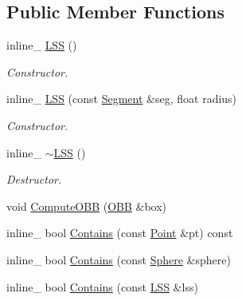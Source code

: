 \subsection*{Public Member Functions}
\begin{DoxyCompactItemize}
\item 
inline\+\_\+ \hyperlink{classOpcode_1_1LSS_ab3ce2e0a510d377bc30d91f4007eb24e}{L\+SS} ()\hypertarget{classOpcode_1_1LSS_ab3ce2e0a510d377bc30d91f4007eb24e}{}\label{classOpcode_1_1LSS_ab3ce2e0a510d377bc30d91f4007eb24e}

\begin{DoxyCompactList}\small\item\em Constructor. \end{DoxyCompactList}\item 
inline\+\_\+ \hyperlink{classOpcode_1_1LSS_ad894b442ef98a841561a26e2f7b96566}{L\+SS} (const \hyperlink{classOpcode_1_1Segment}{Segment} \&seg, float radius)\hypertarget{classOpcode_1_1LSS_ad894b442ef98a841561a26e2f7b96566}{}\label{classOpcode_1_1LSS_ad894b442ef98a841561a26e2f7b96566}

\begin{DoxyCompactList}\small\item\em Constructor. \end{DoxyCompactList}\item 
inline\+\_\+ \hyperlink{classOpcode_1_1LSS_a4f570ca299ea69ecad6fce52d3a33d03}{$\sim$\+L\+SS} ()\hypertarget{classOpcode_1_1LSS_a4f570ca299ea69ecad6fce52d3a33d03}{}\label{classOpcode_1_1LSS_a4f570ca299ea69ecad6fce52d3a33d03}

\begin{DoxyCompactList}\small\item\em Destructor. \end{DoxyCompactList}\item 
void \hyperlink{classOpcode_1_1LSS_ad52f13885dfe3a773154dc1597ab359a}{Compute\+O\+BB} (\hyperlink{classOpcode_1_1OBB}{O\+BB} \&box)
\item 
inline\+\_\+ bool \hyperlink{classOpcode_1_1LSS_a12820c729caa83355cc3de770d2e43e4}{Contains} (const \hyperlink{classOpcode_1_1Point}{Point} \&pt) const 
\item 
inline\+\_\+ bool \hyperlink{classOpcode_1_1LSS_a88c641f0e90118d5b9714d6706385e00}{Contains} (const \hyperlink{classOpcode_1_1Sphere}{Sphere} \&sphere)
\item 
inline\+\_\+ bool \hyperlink{classOpcode_1_1LSS_aacac9a9588ded18465182686f339c88b}{Contains} (const \hyperlink{classOpcode_1_1LSS}{L\+SS} \&lss)
\end{DoxyCompactItemize}
